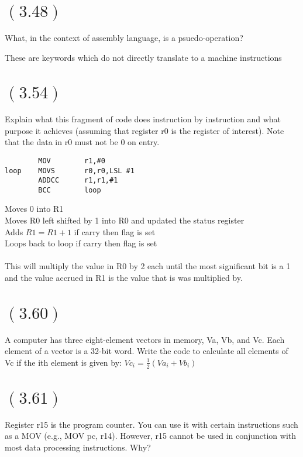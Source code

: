 \documentclass[letterpaper,12pt,titlepage]{article}
\begin{document}
\section*{$(3.48)$} What, in the context of assembly language, is a psuedo-operation?

\begin{mdframed}[style=MyFrame]
These are keywords which do not directly translate to a machine instructions
\end{mdframed}
\newpage
\section*{$(3.54)$} Explain what this fragment of code does instruction by instruction and what purpose it achieves (assuming that register r0 is the register of interest). Note that the data in r0 must not be 0 on entry.
\begin{verbatim}
        MOV        r1,#0
loop    MOVS       r0,r0,LSL #1
        ADDCC      r1,r1,#1
        BCC        loop
\end{verbatim}

\begin{mdframed}[style=MyFrame]
Moves 0 into R1\\
Moves R0 left shifted by 1 into R0 and updated the status register\\
Adds $R1 = R1 + 1$ if carry then flag is set\\
Loops back to loop if carry then flag is set\\ \\

This will multiply the value in R0 by 2 each until the most significant bit is a 1 and the value accrued in R1 is the value that is was multiplied by. 
\end{mdframed}

\newpage
\section*{$(3.60)$} A computer has three eight-element vectors in memory, Va, Vb, and Vc. Each element of a vector is a 32-bit word. Write the code to calculate all elements of Vc if the ith element is given by: $Vc_i = \frac{1}{2} ( Va_i + Vb_i)$
\begin{mdframed}[style=MyFrame]

\end{mdframed}
\newpage

\section*{$(3.61)$} Register r15 is the program counter. You can use it with certain instructions such as a MOV (e.g., MOV pc, r14). However, r15 cannot be used in conjunction with most data processing instructions. Why?
\end{document}
